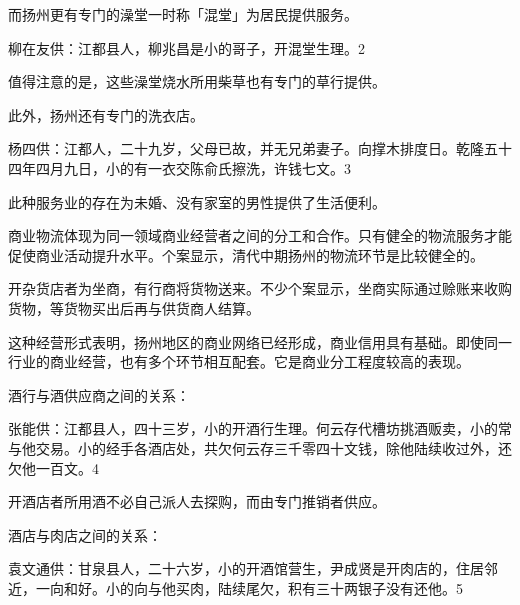 而扬州更有专门的澡堂一时称「混堂」为居民提供服务。

\begin{BookQuote}
柳在友供：江都县人，柳兆昌是小的哥子，开混堂生理。2
\end{BookQuote}

值得注意的是，这些澡堂烧水所用柴草也有专门的草行提供。

此外，扬州还有专门的洗衣店。

\begin{BookQuote}
杨四供：江都人，二十九岁，父母已故，并无兄弟妻子。向撑木排度日。乾隆五十四年四月九日，小的有一衣交陈俞氏擦洗，许钱七文。3
\end{BookQuote}

此种服务业的存在为未婚、没有家室的男性提供了生活便利。

\vfill
\begin{BookNotes}
\end{BookNotes}


商业物流体现为同一领域商业经营者之间的分工和合作。只有健全的物流服务才能促使商业活动提升水平。个案显示，清代中期扬州的物流环节是比较健全的。

开杂货店者为坐商，有行商将货物送来。不少个案显示，坐商实际通过赊账来收购货物，等货物买出后再与供货商人结算。

这种经营形式表明，扬州地区的商业网络已经形成，商业信用具有基础。即使同一行业的商业经营，也有多个环节相互配套。它是商业分工程度较高的表现。

酒行与酒供应商之间的关系：

\begin{BookQuote}
张能供：江都县人，四十三岁，小的开酒行生理。何云存代槽坊挑酒贩卖，小的常与他交易。小的经手各酒店处，共欠何云存三千零四十文钱，除他陆续收过外，还欠他一百文。4
\end{BookQuote}

开酒店者所用酒不必自己派人去探购，而由专门推销者供应。

酒店与肉店之间的关系：

\begin{BookQuote}
袁文通供：甘泉县人，二十六岁，小的开酒馆营生，尹成贤是开肉店的，住居邻近，一向和好。小的向与他买肉，陆续尾欠，积有三十两银子没有还他。5
\end{BookQuote}

